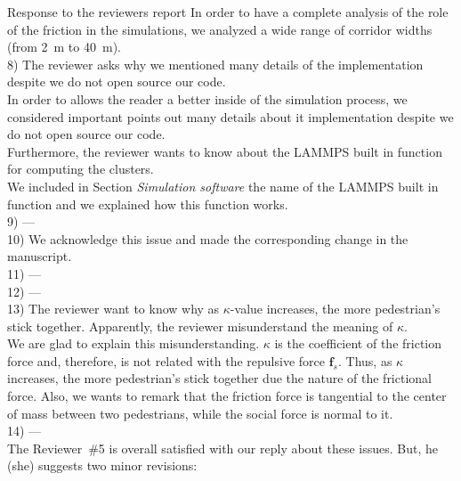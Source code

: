 \documentclass[a4paper,12pt]{letter}
\begin{document}
\begin{letter}{Response to the reviewers report}
{In order to have a complete analysis of the role of the friction in the 
simulations, we analyzed a wide range of corridor widths (from 2~m to 40~m). \\ 

8) The reviewer asks why we mentioned many details of the implementation despite 
we do not open source our code. \\

In order to allows the reader a better inside of the simulation process, we 
considered important points out many details about it implementation despite we 
do not open source our code. \\

Furthermore, the reviewer wants to know about the LAMMPS built in function for 
computing the clusters. \\

We included in Section \textit{Simulation software} the name of the LAMMPS 
built in function and we explained how this function works. \\ 

9) --- \\

10) We acknowledge this issue and made the corresponding change in the 
manuscript.\\

11) --- \\

12) --- \\

13) The reviewer want to know why as $\kappa$-value increases, the more 
pedestrian's stick together. Apparently, the reviewer misunderstand the meaning 
of $\kappa$. \\

We are glad to explain this misunderstanding. $\kappa$ is the coefficient of the 
friction force and, therefore, is not related with the repulsive force 
$\mathbf{f}_s$. Thus, as $\kappa$ increases, the more pedestrian's stick 
together due the nature of the frictional force. Also, we wants to remark that 
the friction force is tangential to the center of mass between two pedestrians, 
while the social force is normal to it. \\

14) ---\\

\iffalse
The Reviewer~\#5 is overall satisfied with our reply about these issues. But, 
he (she) suggests two minor revisions:\\

}
\end{letter}
\end{document}
